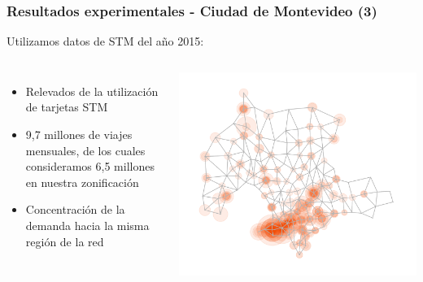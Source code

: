 \documentclass[aspectratio=43, 10pt]{beamer}
\begin{document}
\begin{frame}
    \frametitle{Resultados experimentales - Ciudad de Montevideo (3)}

    Utilizamos datos de STM del año 2015:
    \begin{columns}[T]
        \begin{itemize}
            \item{Relevados de la utilización de tarjetas STM}
            \item{9,7 millones de viajes mensuales, de los cuales consideramos 6,5 millones en nuestra zonificación}
            \item{Concentración de la demanda hacia la misma región de la red}
        \end{itemize}
            \includegraphics[width=\textwidth]{images/mdeo_demand_topN.png}
    \end{columns}
\end{frame}
\end{document}
